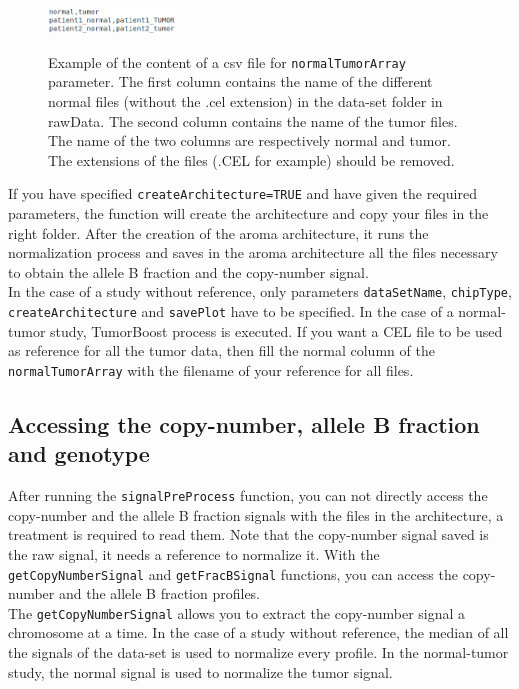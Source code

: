 \documentclass[a4paper,10pt]{article}
\begin{document}
		\begin{figure}[!h]
			\centering
			\includegraphics[width=0.3\textwidth]{fig/normalTumorArray}\\
			\caption{Example of the content of a csv file for \texttt{normalTumorArray} parameter. The first column contains the name of the different normal files (without the .cel extension) in the data-set folder in rawData. The second column contains the name of the tumor files. The name of the two columns are respectively normal and tumor. The extensions of the files (.CEL for example) should be removed.}
			\label{normalTumorArray}
		\end{figure}

		If you have specified \texttt{createArchitecture=TRUE} and have given the required parameters, the function will create the architecture and copy your files in the right folder. After the creation of the aroma architecture, it runs the normalization process and saves in the aroma architecture all the files necessary to obtain the allele B fraction and the copy-number signal.\\
		
		In the case of a study without reference, only parameters \texttt{dataSetName}, \texttt{chipType}, \texttt{createArchitecture} and \texttt{savePlot} have to be specified. In the case of a normal-tumor study, TumorBoost process is executed.
		If you want a CEL file to be used as reference for all the tumor data, then fill the normal column of the \texttt{normalTumorArray} with the filename of your reference for all files.
		
	\subsection{Accessing the copy-number,  allele B fraction and genotype}		
		\label{getter}
		After running the \texttt{signalPreProcess} function, you can not directly access the copy-number and the allele B fraction signals with the files in the architecture, a treatment is required to read them. Note that the copy-number signal saved is the raw signal, it needs a reference to normalize it. With the \texttt{getCopyNumberSignal} and \texttt{getFracBSignal} functions, you can access the copy-number and the allele B fraction profiles.\\
		
		The \texttt{getCopyNumberSignal} allows you to extract the copy-number signal a chromosome at a time. In the case of a study without reference, the median of all the signals of the data-set is used to normalize every profile. In the normal-tumor study, the normal signal is used to normalize the tumor signal.
		
\end{document}
